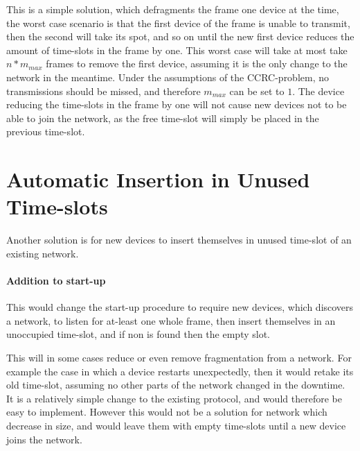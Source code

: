 \bigskip

This is a simple solution, which defragments the frame one device at the time, the worst case scenario is that the first device of the frame is unable to transmit, then the second will take its spot, and so on until the new first device reduces the amount of time-slots in the frame by one. 
This worst case will take at most take $n * m_{max}$ frames to remove the first device, assuming it is the only change to the network in the meantime. 
Under the assumptions of the CCRC-problem, no transmissions should be missed, and therefore $m_{max}$ can be set to $1$. 
The device reducing the time-slots in the frame by one will not cause new devices not to be able to join the network, as the free time-slot will simply be placed in the previous time-slot. 

\section{Automatic Insertion in Unused Time-slots}
Another solution is for new devices to insert themselves in unused time-slot of an existing network.

\paragraph{Addition to start-up}
This would change the start-up procedure to require new devices, which discovers a network, to listen for at-least one whole frame, then insert themselves in an unoccupied time-slot, and if non is found then the empty slot. 

\bigskip

This will in some cases reduce or even remove fragmentation from a network. 
For example the case in which a device restarts unexpectedly, then it would retake its old time-slot, assuming no other parts of the network changed in the downtime.
It is a relatively simple change to the existing protocol, and would therefore be easy to implement.  
However this would not be a solution for network which decrease in size, and would leave them with empty time-slots until a new device joins the network. 